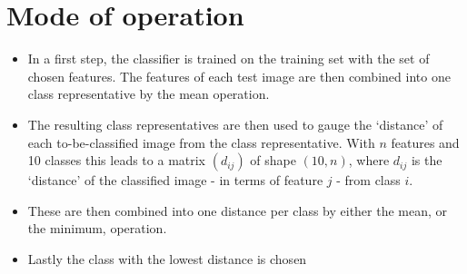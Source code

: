 \documentclass[a4paper]{scrreprt}
\newcommand{\var}[1]{\textit{#1}}
\newcommand{\op}[1]{\textsl{#1}}
\begin{document}

\section{Mode of operation}

\begin{itemize}
		\item In a first step, the classifier is trained on the training set
				with the set of chosen features. The features of each test
				image are then combined into one class representative by the
				mean operation.

		\item The resulting class representatives are then used to gauge the
				`distance' of each to-be-classified image from the class
				representative. With $n$ features and 10 classes this leads to
				a matrix $(d_{ij})$ of shape $(10, n)$, where $d_{ij}$ is the
				`distance' of the classified image - in terms of feature $j$ -
				from class $i$.

		\item These are then combined into one distance per class by either the
				mean, or the minimum, operation.

		\item Lastly the class with the lowest distance is chosen
\end{itemize}
\end{document}
